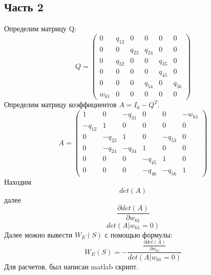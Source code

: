 \documentclass[14pt,a4paper,report]{report}
\begin{document}
\subsection{Часть 2}

Определим матрицу Q:
\begin{equation*}
Q = 
 \begin{pmatrix}
  0 & q_{12} & 0 & 0 & 0 & 0 \\
  0 & 0 & q_{23} & q_{24} & 0 & 0 \\ 
  0 & q_{32} & 0 & 0 & q_{35} & 0 \\ 
  0 & 0 & 0 & 0 & q_{45} & 0 \\ 
  0 & 0 & 0 & q_{54} & 0 & q_{56} \\ 
  w_{61} & 0 & 0 & 0 & 0 & 0 
 \end{pmatrix}
\end{equation*}
Определим матрицу коэффициентов $A=I_6-Q^T$.
\begin{equation*}
A = 
 \begin{pmatrix}
    1&       0&    -q_{31}&    0&    0& -w_{61}\\
 -q_{12} & 1 & 0&    0&       0&    0\\
    0&    -q_{23}&    1&    0&       -q_{53}&    0\\
    0&       -q_{24}& -q_{34}&    1&       0&    0\\
    0&       0&    0& -q_{45}& 1 &    0\\
    0&       0&    0&    -q_{46}&    -q_{56}&    1
 \end{pmatrix}
\end{equation*}
Находим 
\begin{equation*}
det(A)
\end{equation*}
далее
\begin{equation*}
\frac{\partial det(A)}{\partial w_{61}}
\end{equation*}
\begin{equation*}
det(A | w_{61}=0)
\end{equation*}
Далее можно вывести $W_E(S)$ с помощью формулы:
\begin{equation*}
W_E(S)=-\frac{\frac{\partial det(A)}{\partial w_{61}}}{det(A | w_{61}=0)}
\end{equation*}
Для расчетов, был написан matlab скрипт.
\end{document}
